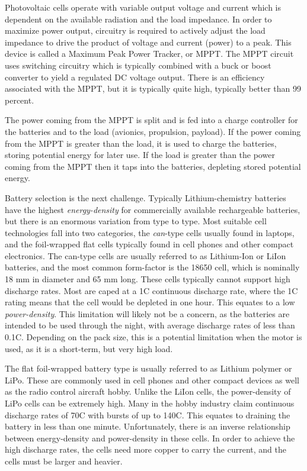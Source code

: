 \documentclass{ifacconf}
\begin{document}
Photovoltaic cells operate with variable output voltage and current which is dependent on the available radiation and the load impedance. In order to maximize power output, circuitry is required to actively adjust the load impedance to drive the product of voltage and current (power) to a peak. This device is called a Maximum Peak Power Tracker, or MPPT. The MPPT circuit uses switching circuitry which is typically combined with a buck or boost converter to yield a regulated DC voltage output. There is an efficiency associated with the MPPT, but it is typically quite high, typically better than 99 percent.

The power coming from the MPPT is split and is fed into a charge controller for the batteries and to the load (avionics, propulsion, payload). If the power coming from the MPPT is greater than the load, it is used to charge the batteries, storing potential energy for later use. If the load is greater than the power coming from the MPPT then it taps into the batteries, depleting stored potential energy.

Battery selection is the next challenge. Typically Lithium-chemistry batteries have the highest \emph{energy-density} for commercially available rechargeable batteries, but there is an enormous variation from type to type. Most suitable cell technologies fall into two categories, the \emph{can}-type cells usually found in laptops, and the foil-wrapped flat cells typically found in cell phones and other compact electronics. The can-type cells are usually referred to as Lithium-Ion or LiIon batteries, and the most common form-factor is the 18650 cell, which is nominally 18 mm in diameter and 65 mm long. These cells typically cannot support high discharge rates. Most are caped at a 1C continuous discharge rate, where the 1C rating means that the cell would be depleted in one hour. This equates to a low \emph{power-density}. This limitation will likely not be a concern, as the batteries are intended to be used through the night, with average discharge rates of less than 0.1C. Depending on the pack size, this is a potential limitation when the motor is used, as it is a short-term, but very high load.

The flat foil-wrapped battery type is usually referred to as Lithium polymer or LiPo. These are commonly used in cell phones and other compact devices as well as the radio control aircraft hobby. Unlike the LiIon cells, the power-density of LiPo cells can be extremely high. Many in the hobby industry claim continuous discharge rates of 70C with bursts of up to 140C. This equates to draining the battery in less than one minute. Unfortunately, there is an inverse relationship between energy-density and power-density in these cells. In order to achieve the high discharge rates, the cells need more copper to carry the current, and the cells must be larger and heavier.
\end{document}
